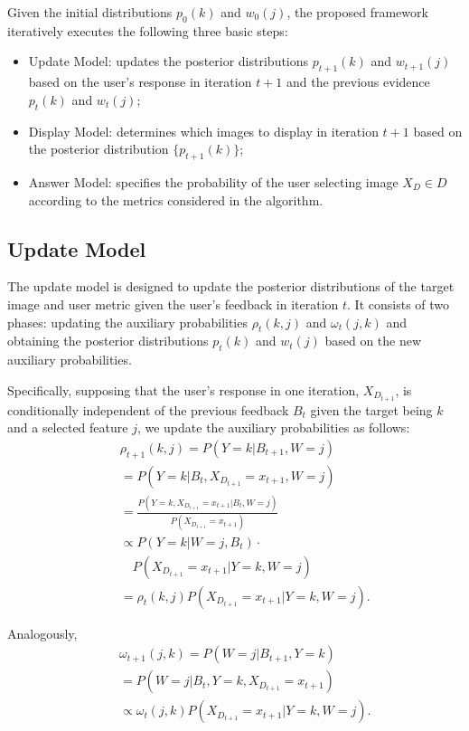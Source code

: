 \documentclass[journal]{IEEEtran}
\begin{document}
Given the initial distributions $p_0(k)$ and $w_0(j)$, the proposed framework iteratively executes the following three basic steps:

\begin{itemize}
\item Update Model: updates the posterior distributions $p_{t+1}(k)$ and $w_{t+1}(j)$ based on the user's response in iteration $t+1$ and the previous evidence $p_t(k)$ and $w_t(j)$;
\item Display Model: determines which images to display in iteration $t+1$ based on the posterior distribution $\{p_{t+1}(k)\}$;
\item Answer Model: specifies the probability of the user selecting image $X_D\in D$ according to the metrics considered in the algorithm.
\end{itemize}

\subsection{Update Model}\label{subsec::updatemodel}
The update model is designed to update the posterior distributions of the target image and user metric given the user's feedback in iteration $t$. It consists of two phases: updating the auxiliary probabilities $\rho_t(k,j)$ and $\omega_t(j,k)$ and obtaining the posterior distributions $p_t(k)$ and $w_t(j)$ based on the new auxiliary probabilities.

Specifically, supposing that the user's response in one iteration, $X_{D_{t+1}}$, is conditionally independent of the previous feedback $B_t$ given the target being $k$ and a selected feature $j$, we update the auxiliary probabilities as follows:
\begin{eqnarray}\label{eqn::rho}
&&\rho_{t+1}(k,j)=P(Y=k|B_{t+1},W=j)\nonumber\\
&&=P(Y=k|B_t,X_{D_{t+1}}=x_{t+1},W=j)\nonumber\\
&&=\frac{P(Y=k,X_{D_{t+1}}=x_{t+1}|B_t,W=j)}{P(X_{D_{t+1}}=x_{t+1})}\nonumber\\
&&\propto P(Y=k|W=j,B_t)\cdot \nonumber\\
&& \quad P(X_{D_{t+1}}=x_{t+1}|Y=k,W=j)\nonumber\\
&&=\rho_t(k,j)P(X_{D_{t+1}}=x_{t+1}|Y=k,W=j).
\end{eqnarray}

Analogously,
\begin{eqnarray}\label{eqn::omega}
&&\omega_{t+1}(j,k) = P(W=j|B_{t+1},Y=k)\nonumber\\
&&=P(W=j|B_t,Y=k,X_{D_{t+1}}=x_{t+1})\nonumber\\
&&\propto \omega_t(j,k)P(X_{D_{t+1}}=x_{t+1}|Y=k,W=j).
\end{eqnarray}
\end{document}
